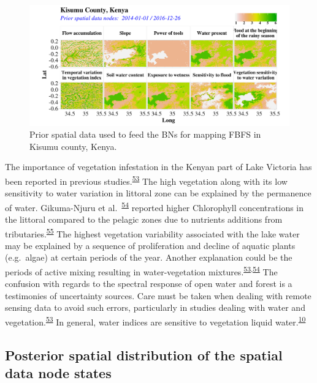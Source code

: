 \documentclass[12pt,oneside]{article}
\begin{document}
\begin{figure}[!htbp]

{\centering \includegraphics[width=1\linewidth,]{figures/Mapping_FBFS_prior_maps} 

}

\caption{Prior spatial data used to feed the BNs for mapping FBFS in Kisumu county, Kenya.}\label{fig:fig11}
\end{figure}

The importance of vegetation infestation in the Kenyan part of Lake Victoria has been reported in previous studies.\textsuperscript{\protect\hyperlink{ref-Cavalli_et_al_2009}{53}} The high vegetation along with its low sensitivity to water variation in littoral zone can be explained by the permanence of water. Gikuma-Njuru et al.~\textsuperscript{\protect\hyperlink{ref-Gikuma-Njuru_et_al_2005}{54}} reported higher Chlorophyll concentrations in the littoral compared to the pelagic zones due to nutrients additions from tributaries.\textsuperscript{\protect\hyperlink{ref-World_Bank_1996}{55}} The highest vegetation variability associated with the lake water may be explained by a sequence of proliferation and decline of aquatic plants (e.g.~algae) at certain periods of the year. Another explanation could be the periods of active mixing resulting in water-vegetation mixtures.\textsuperscript{\protect\hyperlink{ref-Cavalli_et_al_2009}{53},\protect\hyperlink{ref-Gikuma-Njuru_et_al_2005}{54}} The confusion with regards to the spectral response of open water and forest is a testimonies of uncertainty sources. Care must be taken when dealing with remote sensing data to avoid such errors, particularly in studies dealing with water and vegetation.\textsuperscript{\protect\hyperlink{ref-Cavalli_et_al_2009}{53}} In general, water indices are sensitive to vegetation liquid water.\textsuperscript{\protect\hyperlink{ref-Boschetti_et_al_2014}{10}}

\hypertarget{II5}{%
\subsection{Posterior spatial distribution of the spatial data node states}\label{II5}}
\end{document}
